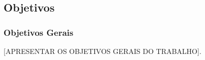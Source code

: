 %
%
%

\subsection{Objetivos} %
\label{sub:objetivos}
\subsubsection{Objetivos Gerais}

[APRESENTAR OS OBJETIVOS GERAIS DO TRABALHO].

